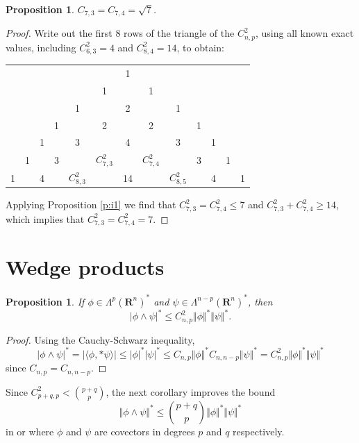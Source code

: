 \documentclass[12pt]{amsart}
\newtheorem{proposition}[theorem]{Proposition}
\theoremstyle{definition}
\theoremstyle{remark}
\numberwithin{equation}{section}
\begin{document}
\begin{proposition}{$C_{7,3}=C_{7,4}=\sqrt 7$.}\end{proposition}%
\begin{proof}
Write out the first 8 rows of the triangle of the $C_{n,p}^2$, using all known exact values, including $C_{6,3}^2 = 4$ and $C_{8,4}^2 =14$, to obtain:

\begin{center}
\begin{tabular}{ccccccccccccc}
&&&&&&1\\
&&&&&1&&1\\
&&&&1&&2&&1\\
&&&1&&2&&2&&1\\
&&1&&3&&4&&3&&1\\
&1&&3&&$C_{7,3}^2$&&$C_{7,4}^2$&&3&&1\\
1&&4&&$C_{8,3}^2$&&14&&$C_{8,5}^2$&&4&&1\\
\end{tabular}
\end{center}
Applying Proposition \ref{p:i1}  we find that $C_{7,3}^2 = C_{7,4}^2 \leq 7$ and $C_{7,3}^2 + C_{7,4}^2 \geq 14$, which implies that $C_{7,3}^2 = C_{7,4}^2=7$.
\end{proof}

\section{Wedge products}%

\begin{proposition}\label{p:w2}%
If $\phi \in \Lambda^p(\mathbf{R}^n)^\ast$ and $\psi \in \Lambda^{n-p}(\mathbf{R}^n)^\ast$, then
 \begin{equation*}
 |\phi\wedge\psi|^\ast \leq C_{n,p}^2  \Vert \phi \Vert^\ast  \Vert \psi\Vert ^\ast.
 \end{equation*}
\end{proposition}
\begin{proof}
Using the Cauchy-Schwarz inequality, 
\begin{equation*}
|\phi\wedge\psi|^\ast = |\langle \phi, *\psi \rangle| \leq |\phi|^\ast |\psi|^\ast \leq C_{n,p} \Vert \phi \Vert^\ast C_{n,n-p} \Vert \psi\Vert ^\ast = C_{n,p}^2  \Vert \phi \Vert^\ast  \Vert \psi\Vert ^\ast
\end{equation*}
since $C_{n,p} =C_{n,n-p}$.
\end{proof}

 Since $C_{p+q,p}^2  < \binom{p+q}{p}$, the next corollary improves the bound 
 \begin{equation*}\Vert\phi\wedge\psi\Vert^\ast \leq  \binom{p+q}{p} \Vert \phi\Vert^\ast\Vert \psi\Vert^\ast \end{equation*} 
 in \cite[p. 39]{HF} or \cite[p. 55]{HW} where $\phi$ and $\psi$ are covectors in degrees $p$ and $q$ respectively.
\end{document}
